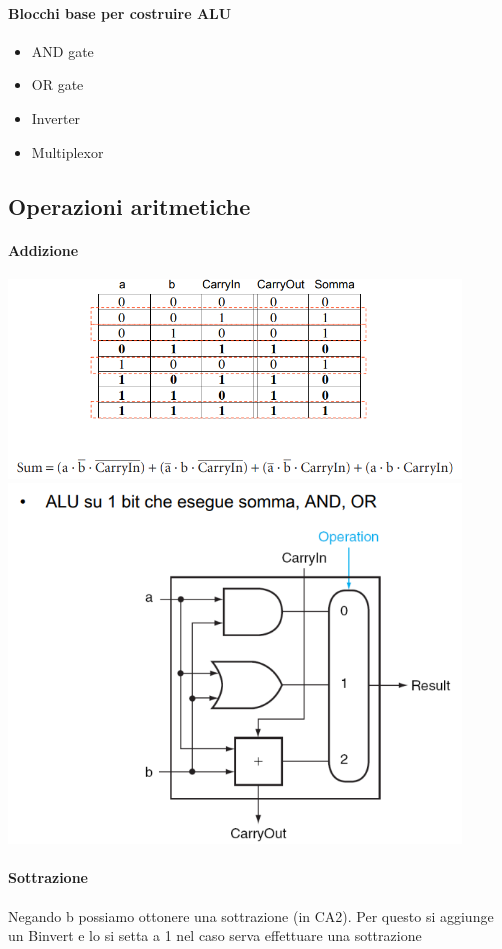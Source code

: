 \documentclass[12pt, a4paper, openany]{book}
\begin{document}
\paragraph{Blocchi base per costruire ALU}
\begin{itemize}
    \item AND gate 
    \item OR gate
    \item Inverter
    \item Multiplexor
\end{itemize}
\subsection{Operazioni aritmetiche}
\paragraph{Addizione}
\begin{center}
    \includegraphics[width=120mm, scale=0.5]{alu_somma.png}
    \includegraphics[width=120mm, scale=0.5]{alu_somma_circuito.png}
\end{center}
\paragraph{Sottrazione}
Negando b possiamo ottonere una sottrazione (in CA2). Per questo si aggiunge un Binvert e lo
si setta a 1 nel caso serva effettuare una sottrazione
\end{document}
